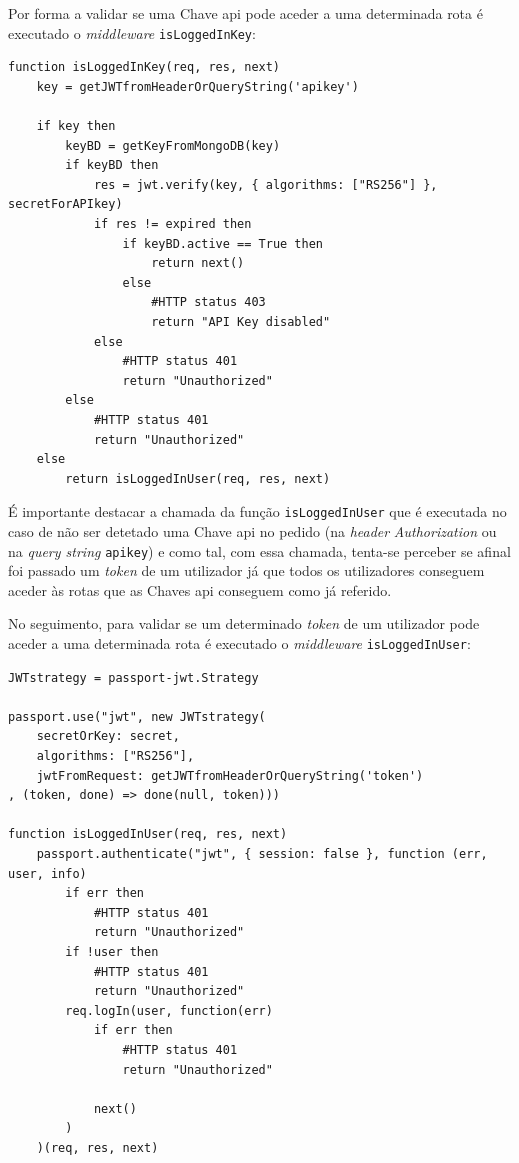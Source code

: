 Por forma a validar se uma Chave \acrshort{api} pode aceder a uma determinada rota é executado o \textit{middleware} \texttt{isLoggedInKey}:
\begin{lstlisting}[language=pseudocode, caption=Verificação se um pedido com uma determinada Chave \acrshort{api} pode ser efetuado]
function isLoggedInKey(req, res, next)
    key = getJWTfromHeaderOrQueryString('apikey')

    if key then
        keyBD = getKeyFromMongoDB(key)
        if keyBD then
            res = jwt.verify(key, { algorithms: ["RS256"] }, secretForAPIkey)
            if res != expired then
                if keyBD.active == True then
                    return next()
                else
                    #HTTP status 403
                    return "API Key disabled"
            else
                #HTTP status 401
                return "Unauthorized"
        else
            #HTTP status 401
            return "Unauthorized"
    else
        return isLoggedInUser(req, res, next)
\end{lstlisting}
É importante destacar a chamada da função \texttt{isLoggedInUser} que é executada no caso de não ser detetado uma Chave \acrshort{api} no pedido (na \textit{header} \textit{Authorization} ou na \textit{query string} \texttt{apikey}) e como tal, com essa chamada, tenta-se perceber se afinal foi passado um \textit{token} de um utilizador já que todos os utilizadores conseguem aceder às rotas que as Chaves \acrshort{api} conseguem como já referido.

No seguimento, para validar se um determinado \textit{token} de um utilizador pode aceder a uma determinada rota é executado o \textit{middleware} \texttt{isLoggedInUser}:
\begin{lstlisting}[language=pseudocode, caption=Verificação se um pedido com um determinado \textit{token} de um utilizador registado pode ser efetuado]
JWTstrategy = passport-jwt.Strategy

passport.use("jwt", new JWTstrategy(
    secretOrKey: secret,
    algorithms: ["RS256"],
    jwtFromRequest: getJWTfromHeaderOrQueryString('token')
, (token, done) => done(null, token)))

function isLoggedInUser(req, res, next)
    passport.authenticate("jwt", { session: false }, function (err, user, info)
        if err then
            #HTTP status 401
            return "Unauthorized"
        if !user then
            #HTTP status 401
            return "Unauthorized"
        req.logIn(user, function(err)
            if err then
                #HTTP status 401
                return "Unauthorized"

            next()
        )
    )(req, res, next)
\end{lstlisting}

